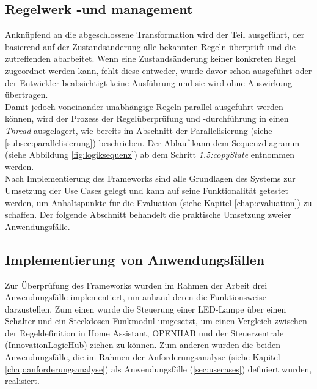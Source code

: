 \subsection{Regelwerk -und management}
    Anknüpfend an die abgeschlossene Transformation wird der Teil ausgeführt, der basierend auf der Zustandsänderung 
    alle bekannten Regeln überprüft und die zutreffenden abarbeitet. Wenn eine Zustandsänderung keiner konkreten Regel zugeordnet 
    werden kann, fehlt diese entweder, wurde davor schon ausgeführt oder der Entwickler beabsichtigt keine Ausführung und sie 
    wird ohne Auswirkung übertragen. 
    \\
    Damit jedoch voneinander unabhängige Regeln parallel ausgeführt werden können, wird der Prozess der Regelüberprüfung und -durchführung 
    in einen \textit{Thread} ausgelagert, wie bereits im Abschnitt der Parallelisierung (siehe \ref{subsec:parallelisierung}) beschrieben. Der Ablauf kann dem 
    Sequenzdiagramm (siehe Abbildung \ref{fig:logiksequenz}) ab dem Schritt \textit{1.5:copyState} entnommen werden. 
    \\
    \linebreak
    Nach Implementierung des Frameworks sind alle Grundlagen des Systems zur Umsetzung der Use Cases gelegt und kann auf seine Funktionalität getestet werden, um 
    Anhaltspunkte für die Evaluation (siehe Kapitel \ref{chap:evaluation}) zu schaffen. Der folgende Abschnitt behandelt die praktische 
    Umsetzung zweier Anwendungsfälle. 

\subsection{Implementierung von Anwendungsfällen}
    Zur Überprüfung des Frameworks wurden im Rahmen der Arbeit drei Anwendungsfälle implementiert, um anhand deren die Funktionsweise 
    darzustellen. Zum einen wurde die Steuerung einer LED-Lampe über einen Schalter und ein Steckdosen-Funkmodul umgesetzt, um einen Vergleich zwischen der 
    Regeldefinition in Home Assistant, \acs{OPENHAB} und der Steuerzentrale (InnovationLogicHub) ziehen zu können. Zum anderen wurden die beiden 
    Anwendungsfälle, die im Rahmen der Anforderungsanalyse (siehe Kapitel \ref{chap:anforderungsanalyse}) als Anwendungsfälle (\ref{sec:usecases}) definiert wurden, realisiert. 
    
